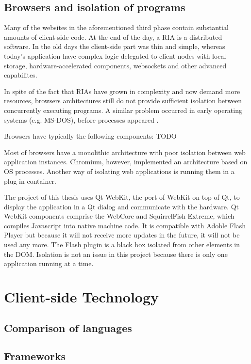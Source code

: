 
\subsection{Browsers and isolation of programs}    
Many of the websites in the aforementioned third phase contain substantial amounts of client-side code. At the end of the day, a \ac{RIA} is a distributed software. 
In the old days the client-side part was thin and simple, whereas today's application have complex logic delegated to client nodes with local storage, hardware-accelerated components, websockets and other advanced capabilites.

In spite of the fact that \acp{RIA} have grown in complexity and now demand more resources, browsers architectures still do not provide sufficient isolation between concurrently executing programs.
A similar problem occurred in early operating systems (e.g. MS-DOS), before processes appeared \cite{Reis:2009}. 

Browsers have typically the following components: TODO

Most of browsers have a monolithic architecture with poor isolation between web application instances. Chromium, however, implemented an architecture based on OS processes. 
Another way of isolating web applications is running them in a plug-in container. 

The project of this thesis uses Qt WebKit, the port of WebKit on top of Qt, to display the application in a Qt dialog and communicate with the hardware. 
Qt WebKit components comprise the WebCore and SquirrelFish Extreme, which compiles Javascript into native machine code. 
It is compatible with Adoble Flash Player but because it will not receive more updates in the future, it will not be used any more.
The Flash plugin is a black box isolated from other elements in the \ac{DOM}.
Isolation is not an issue in this project because there is only one application running at a time.

\section{Client-side Technology}


\subsection{Comparison of languages}
\subsection{Frameworks}

